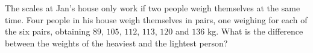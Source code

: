 The scales at Jan's house only work if two people weigh themselves at the same time. Four people in his house weigh themselves in pairs, one weighing for each of the six pairs, obtaining $89$, $105$, $112$, $113$, $120$ and $136$ kg. What is the difference between the weights of the heaviest and the lightest person?
